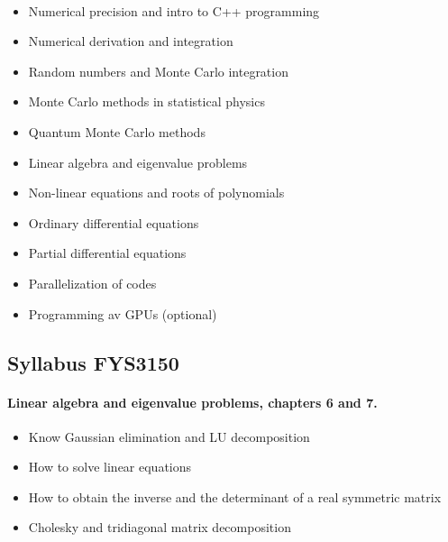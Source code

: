 \documentclass[%
oneside,                 %
final,                   %
10pt]{article}
\begin{document}
\paragraph{}
\begin{itemize}
  \item Numerical precision and intro to C++ programming

  \item Numerical derivation and integration

  \item Random numbers and Monte Carlo integration

  \item Monte Carlo methods in statistical physics

  \item Quantum Monte Carlo methods

  \item Linear algebra and eigenvalue problems

  \item Non-linear equations and roots of polynomials

  \item Ordinary differential equations

  \item Partial differential equations

  \item Parallelization of codes

  \item Programming av GPUs (optional)
\end{itemize}

\noindent




\subsection{Syllabus FYS3150}


\paragraph{Linear algebra and eigenvalue problems, chapters 6 and 7.}
\begin{itemize}
  \item Know Gaussian elimination and LU decomposition

  \item How to solve linear equations

  \item How to obtain the inverse and the determinant of a real symmetric matrix

  \item Cholesky and tridiagonal matrix decomposition
\end{itemize}
\end{document}
